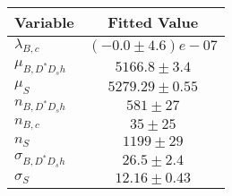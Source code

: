 \begin{tabular}[t]{lc}
\hline
Variable &Fitted Value\\
\hline\hline
$\lambda_{B,c}$&$(-0.0\pm4.6)e-07$\\
\hline
$\mu_{B, D^* D_s h}$&$5166.8\pm3.4$\\
\hline
$\mu_S$&$5279.29\pm0.55$\\
\hline
$n_{B, D^* D_s h}$&$581\pm27$\\
\hline
$n_{B,c}$&$35\pm25$\\
\hline
$n_S$&$1199\pm29$\\
\hline
$\sigma_{B, D^* D_s h}$&$26.5\pm2.4$\\
\hline
$\sigma_S$&$12.16\pm0.43$\\
\hline
\end{tabular}